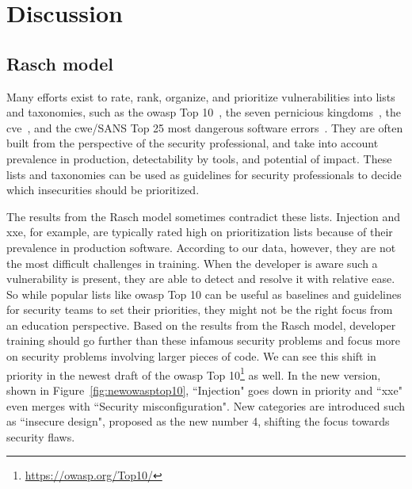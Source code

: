 \section{Discussion}
\label{sec:its-discussion}

\subsection{Rasch model}
Many efforts exist to rate, rank, organize, and prioritize vulnerabilities into lists and taxonomies, such as the \gls{owasp} Top 10~\cite{wichers2017owasp}, the seven pernicious kingdoms~\cite{tsipenyuk2005seven}, the \gls{cve}~\cite{guo2009ontology,mann1999towards,baker1999development}, and the \gls{cwe}/SANS Top 25 most dangerous software errors~\cite{martin20112011}.
They are often built from the perspective of the security professional, and take into account prevalence in production, detectability by tools, and potential of impact.
These lists and taxonomies can be used as guidelines for security professionals to decide which insecurities should be prioritized.

The results from the Rasch model sometimes contradict these lists.
Injection and \gls{xxe}, for example, are typically rated high on prioritization lists because of their prevalence in production software.
According to our data, however, they are not the most difficult challenges in training.
When the developer is aware such a vulnerability is present, they are able to detect and resolve it with relative ease.
So while popular lists like \gls{owasp} Top 10 can be useful as baselines and guidelines for security teams to set their priorities, they might not be the right focus from an education perspective.
Based on the results from the Rasch model, developer training should go further than these infamous security problems and focus more on security problems involving larger pieces of code.
We can see this shift in priority in the newest draft of the \gls{owasp} Top 10\footnote{\url{https://owasp.org/Top10/}} as well.
In the new version, shown in Figure~\ref{fig:newowasptop10}, ``Injection" goes down in priority and ``\gls{xxe}" even merges with ``Security misconfiguration".
New categories are introduced such as ``insecure design", proposed as the new number 4, shifting the focus towards security flaws.

